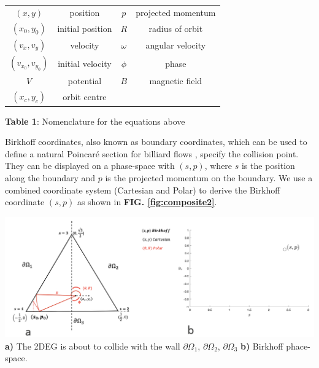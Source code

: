 \documentclass[a0,portrait]{a0poster}
\begin{document}
\begin{multicols}{3}
\begin{tabular}{cccc}
\toprule
$(x,y)$ & position & $p$ & projected momentum  \\
$(x_0,y_0)$ & initial position & $R$ & radius of orbit \\
$(v_x,v_y)$ & velocity & $\omega$ & angular velocity \\
$(v_{x_0},v_{y_0})$ & initial velocity & $\phi$ &phase \\
$V$ & potential & $B$ & magnetic field \\
$(x_c,y_c)$ & orbit centre &&\\
\bottomrule
\end{tabular}
\begin{center}
    \textbf{Table 1}: Nomenclature for the equations above
\end{center}


Birkhoff coordinates, also known as boundary coordinates, which can be used to define a natural Poincaré section for billiard flows \cite{cvitanovic2020chaos}, specify the collision point. They can be displayed on a phase-space with $(s,p)$, where $s$ is the position along the boundary and $p$ is the projected momentum on the boundary. We use a combined coordinate system (Cartesian and Polar) to derive the Birkhoff coordinate $(s,p)$ as shown in \textbf{FIG. \ref{fig:composite2}}.

\begin{center}\vspace{1cm}
    \includegraphics[width=1.0\linewidth]{composite2.png}
     {\textbf{a)} The 2DEG is about to collide with the wall $\partial \Omega_1$, $\partial \Omega_2$, $\partial \Omega_3$ \textbf{b)} Birkhoff phace-space.}
    \label{fig:composite2}
\end{center}%



\end{multicols}
\end{document}
